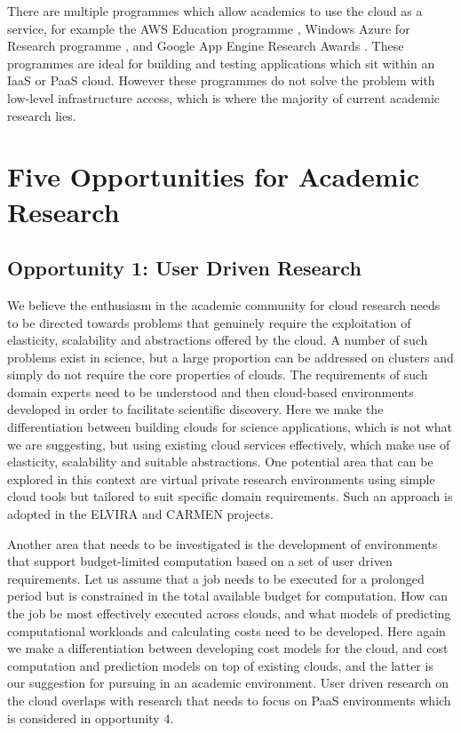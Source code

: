 \documentclass[letterpaper,twocolumn,10pt]{article}
\begin{document}
There are multiple programmes which allow academics to use the cloud as a service, for example the AWS Education programme \cite{aws}, Windows Azure for Research programme \cite{azure}, and Google App Engine Research Awards \cite{app_engine}. These programmes are ideal for building and testing applications which sit within an IaaS or PaaS cloud. However these programmes do not solve the problem with low-level infrastructure access, which is where the majority of current academic research lies. 

\section{Five Opportunities for Academic Research}



\subsection*{Opportunity 1: User Driven Research}
We believe the enthusiasm in the academic community for cloud research needs to be directed towards problems that genuinely require the exploitation of elasticity, scalability and abstractions offered by the cloud. A number of such problems exist in science, but a large proportion can be addressed on clusters and simply do not require the core properties of clouds. The requirements of such domain experts need to be understood and then cloud-based environments developed in order to facilitate scientific discovery. Here we make the differentiation between building clouds for science applications, which is not what we are suggesting, but using existing cloud services effectively, which make use of elasticity, scalability and suitable abstractions. One potential area that can be explored in this context are virtual private research environments using simple cloud tools but tailored to suit specific domain requirements. Such an approach is adopted in the ELVIRA \cite{elvira} and CARMEN \cite{carmen} projects.

Another area that needs to be investigated is the development of environments that support budget-limited computation based on a set of user driven requirements. Let us assume that a job needs to be executed for a prolonged period but is constrained in the total available budget for computation. How can the job be most effectively executed across clouds, and what models of predicting computational workloads and calculating costs need to be developed. Here again we make a differentiation between developing cost models for the cloud, and cost computation and prediction models on top of existing clouds, and the latter is our suggestion for pursuing in an academic environment. User driven research on the cloud overlaps with research that needs to focus on PaaS environments which is considered in opportunity 4. 
\end{document}
